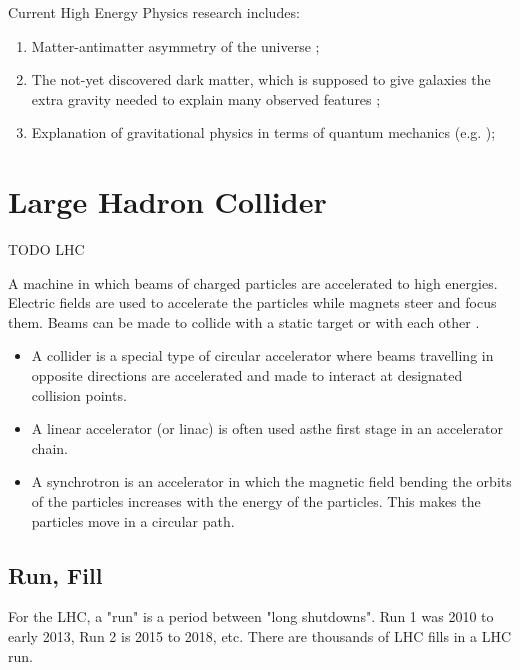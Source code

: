 Current High Energy Physics research includes:
\begin{enumerate}
	\item Matter-antimatter asymmetry of the universe \cite{Bernreuther:2002uj};
	\item The not-yet discovered dark matter, which is supposed to give galaxies the extra gravity needed to explain many observed features \cite{bertone2005particle};
	\item Explanation of gravitational physics in terms of quantum mechanics (e.g. \cite{Rovelli:2011eq});
\end{enumerate}

\section{Large Hadron Collider}


TODO LHC

A machine in which beams of charged particles are accelerated to high energies. Electric fields are used to accelerate the particles while magnets steer and focus them. Beams can be made to collide with a static target or with each other \cite{CERNGlossary}.

\begin{itemize}

\item A collider is a special type of circular accelerator where beams travelling in opposite directions are accelerated and made to interact at designated collision points.

\item A linear accelerator (or linac) is often used asthe first stage in an accelerator chain.

\item A synchrotron is an accelerator in which the magnetic field bending the orbits of the particles increases with the energy of the particles. This makes the particles move in a circular path.

\end{itemize}

\subsection{Run, Fill}

For the LHC, a "run" is a period between "long shutdowns". Run 1 was 2010 to early 2013, Run 2 is 2015 to 2018, etc. There are thousands of LHC fills in a LHC run.

